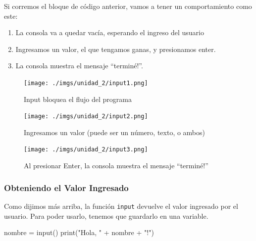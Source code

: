 \documentclass[
  letterpaper,
  DIV=11,
  numbers=noendperiod]{scrreprt}
\newenvironment{Shaded}{\begin{snugshade}}{\end{snugshade}}
\newcommand{\BuiltInTok}[1]{\textcolor[rgb]{0.00,0.23,0.31}{#1}}
\newcommand{\NormalTok}[1]{\textcolor[rgb]{0.00,0.23,0.31}{#1}}
\newcommand{\OperatorTok}[1]{\textcolor[rgb]{0.37,0.37,0.37}{#1}}
\newcommand{\StringTok}[1]{\textcolor[rgb]{0.13,0.47,0.30}{#1}}
\providecommand{\tightlist}{%
  \setlength{\itemsep}{0pt}\setlength{\parskip}{0pt}}\usepackage{longtable,booktabs,array}
\begin{document}
Si corremos el bloque de código anterior, vamos a tener un
comportamiento como este:

\begin{enumerate}
\def\labelenumi{\arabic{enumi}.}
\tightlist
\item
  La consola va a quedar vacía, esperando el ingreso del usuario
\item
  Ingresamos un valor, el que tengamos ganas, y presionamos enter.
\item
  La consola muestra el mensaje ``terminé!''.
\end{enumerate}

\begin{figure}[H]

{\centering \texttt{[image: ./imgs/unidad\_2/input1.png]}

}

\caption{Input bloquea el flujo del programa}

\end{figure}%
\begin{figure}[H]

{\centering \texttt{[image: ./imgs/unidad\_2/input2.png]}

}

\caption{Ingresamos un valor (puede ser un número, texto, o ambos)}

\end{figure}%
\begin{figure}[H]

{\centering \texttt{[image: ./imgs/unidad\_2/input3.png]}

}

\caption{Al presionar Enter, la consola muestra el mensaje ``terminé!''}

\end{figure}%

\subsubsection{Obteniendo el Valor
Ingresado}\label{obteniendo-el-valor-ingresado}

Como dijimos más arriba, la función \texttt{input} devuelve el valor
ingresado por el usuario. Para poder usarlo, tenemos que guardarlo en
una variable.

\begin{Shaded}
\begin{Highlighting}[]
\NormalTok{nombre }\OperatorTok{=} \BuiltInTok{input}\NormalTok{()}
\BuiltInTok{print}\NormalTok{(}\StringTok{"Hola, "} \OperatorTok{+}\NormalTok{ nombre }\OperatorTok{+} \StringTok{"!"}\NormalTok{)}
\end{Highlighting}
\end{Shaded}
\end{document}
